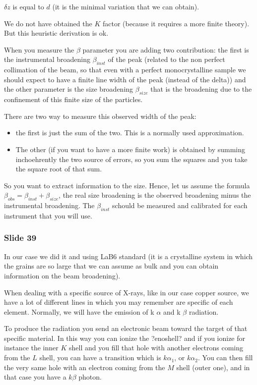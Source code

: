 \documentclass[../main/main.tex]{subfiles}
\begin{document}
\( \delta z \) is equal to \( d \) (it is the minimal variation that we can obtain).

We do not have obtained the \( K \) factor (because it requires a more finite theory). But this heuristic derivation is ok.

When you measure the \( \beta  \) parameter you are adding two contribution: the first is the instrumental broadening \( \beta _{inst} \) of the peak (related to the non perfect collimation of the beam, so that even with a perfect monocrystalline sample we should expect to have a finite line width of the peak (instead of the delta)) and the other parameter is the size broadening \( \beta _{size} \) that is the broadening due to the confinement of this finite size of the particles.

There are two way to measure this observed width of the peak:
\begin{itemize}
\item the first is just the sum of the two. This is a normally used approximation.

\item The other (if you want to have a more finite work) is obtained by summing inchoehrently the two source of errors, so you sum the squares and you take the square root of that sum.

\end{itemize}

So you want to extract information to the size. Hence, let us assume the formula \( \beta _{obs} = \beta _{inst} + \beta _{size} \), the real size broadening is the observed broadening minus the instrumental broadening. The \( \beta _{inst} \) schould be measured and calibrated for each instrument that you will use.


\subsubsection{Slide 39}

In our case we did it and using LaB6 standard (it is a crystalline system in which the grains are so large that we can assume as bulk and you can obtain information on the beam broadening).

When dealing with a specific source of X-rays, like in our case copper source, we have a lot of different lines in which you may remember are specific of each element. Normally, we will have the emission of k \( \alpha  \) and k \( \beta \) radiation.

To produce the radiation you send an electronic beam toward the target of that specific material. In this way you can ionize the ?enoshell? and if you ionize for instance the inner \( K \) shell and you fill that hole with another electrons coming from the \( L \) shell, you can have a transition which is \( k \alpha _1 \), or \( k \alpha _2 \).
You can then fill the very same hole with an electron coming from the \( M \) shell (outer one), and in that case you have a \( k \beta  \) photon.
\end{document}
